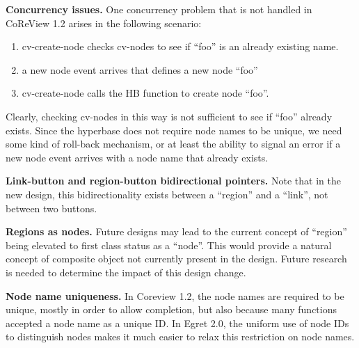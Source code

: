 \begin{itemizenoindent}
\item {\bf Concurrency issues.}  One concurrency problem that is not
handled in CoReView 1.2 arises in the following scenario:
\begin{enumerate}
\item cv-create-node checks cv-nodes to see if ``foo'' is an already existing name.
\item a new node event arrives that defines a new node ``foo''
\item cv-create-node calls the HB function to create node ``foo''.
\end{enumerate}
Clearly, checking cv-nodes in this way is not sufficient to see if ``foo'' already
exists.  Since the hyperbase does not require node names to be unique, we
need some kind of roll-back mechanism, or at least the ability to signal an
error if a new node event arrives with a node name that already exists.

\item {\bf Link-button and region-button bidirectional pointers.} Note that
in the new design, this bidirectionality exists between a ``region'' and
a ``link'', not between two buttons.

\item {\bf Regions as nodes.}  Future designs may lead to the current concept
of ``region'' being elevated to first class status as a ``node''.  This would
provide a natural concept of composite object not currently present in the 
design.  Future research is needed to determine the impact of this design
change.

\item {\bf Node name uniqueness.}  In Coreview 1.2, the node names are 
required to be unique, mostly in order to allow completion, but also because
many functions accepted a node name as a unique ID.  In Egret 2.0, the 
uniform use of node IDs to distinguish nodes makes it much easier to 
relax this restriction on node names.   

\end{itemizenoindent}














